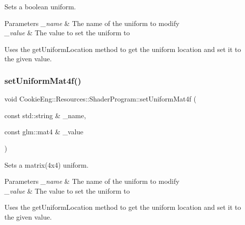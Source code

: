 Sets a boolean uniform. 


\begin{DoxyParams}{Parameters}
{\em \+\_\+name} & The name of the uniform to modify \\
\hline
{\em \+\_\+value} & The value to set the uniform to\\
\hline
\end{DoxyParams}
Uses the get\+Uniform\+Location method to get the uniform location and set it to the given value. \mbox{\label{class_cookie_eng_1_1_resources_1_1_shader_program_a172752bb917cb141b1a3a1cc44b6a645}} 
\subsubsection{\texorpdfstring{set\+Uniform\+Mat4f()}{setUniformMat4f()}}
{\footnotesize\ttfamily void Cookie\+Eng\+::\+Resources\+::\+Shader\+Program\+::set\+Uniform\+Mat4f (\begin{DoxyParamCaption}\item[{const std\+::string \&}]{\+\_\+name,  }\item[{const glm\+::mat4 \&}]{\+\_\+value }\end{DoxyParamCaption})}



Sets a matrix(4x4) uniform. 


\begin{DoxyParams}{Parameters}
{\em \+\_\+name} & The name of the uniform to modify \\
\hline
{\em \+\_\+value} & The value to set the uniform to\\
\hline
\end{DoxyParams}
Uses the get\+Uniform\+Location method to get the uniform location and set it to the given value. \mbox{\label{class_cookie_eng_1_1_resources_1_1_shader_program_a3fad7ebcee80d0cae25dfcca62c70e63}} 
